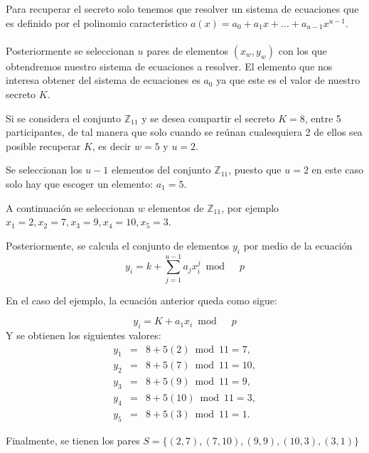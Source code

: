 Para recuperar el secreto solo tenemos que resolver un sistema de ecuaciones  que es definido por el polinomio característico $a(x)=a_0+a_1x+...+a_{u-1}x^{u-1}$.
\\
\\
Posteriormente se seleccionan $u$ pares de elementos $(x_w,y_w)$ con los que obtendremos nuestro sistema de ecuaciones a resolver. El elemento que nos interesa obtener del sistema de ecuaciones es $a_0$ ya que este es el valor de nuestro secreto $K$.
\begin{example}
Si se considera el conjunto  $\mathbb{Z}_{11}$ y se desea compartir el secreto $K=8$, entre 5 participantes,
de tal manera que solo cuando se re\'unan cualesquiera 2 de ellos sea posible recuperar $K$, es decir
 $w=5$ y $u=2$.

Se seleccionan los $u-1$ elementos del conjunto $\mathbb{Z}_{11}$, puesto que $u=2$ en este caso solo 
hay que escoger un elemento: $a_1=5$.

A continuaci\'on se seleccionan $w$ elementos de $\mathbb{Z}_{11}$, por ejemplo 
 $x_1=2, x_2=7, x_3=9, x_4=10, x_5=3$.

Posteriormente, se calcula el conjunto de elementos $y_i$ por medio de la ecuaci\'on 
\begin{equation} \nonumber
 y_i=k+\sum_{j=1}^{u-1} a_j x_i^j \bmod \quad p
\end{equation}

En el caso del ejemplo, la ecuaci\'on anterior queda como sigue:

\begin{equation} \nonumber
 y_i=K+a_1x_i \bmod \quad p
\end{equation}
Y se obtienen los siguientes valores:
$$\begin{array}{lcl}
y_1&=&8+5(2) \bmod 11=7, \\
y_2&=&8+5(7) \bmod 11=10,\\
y_3&=&8+5(9) \bmod 11=9, \\ 
y_4&=&8+5(10) \bmod11=3, \\
y_5&=&8+5(3) \bmod 11=1. 
\end{array}$$

Finalmente, se tienen los pares $S=\{ (2,7), (7,10), (9,9), (10,3),(3,1)\}$



\end{example}
